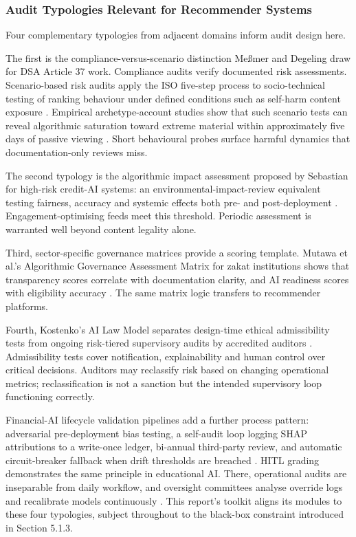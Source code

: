 \documentclass[11pt]{article}
\begin{document}
\subsubsection{Audit Typologies Relevant for Recommender Systems}
\label{sec:audit_typologies_recommenders} Four complementary typologies from adjacent domains inform audit design here.

The first is the compliance-versus-scenario distinction Me{\ss}mer and Degeling draw for DSA Article 37 work. Compliance audits verify documented risk assessments. Scenario-based risk audits apply the ISO five-step process to socio-technical testing of ranking behaviour under defined conditions such as self-harm content exposure \parencites[21]{3195574}. Empirical archetype-account studies show that such scenario tests can reveal algorithmic saturation toward extreme material within approximately five days of passive viewing \parencites[4]{2580223}. Short behavioural probes surface harmful dynamics that documentation-only reviews miss.

The second typology is the algorithmic impact assessment proposed by Sebastian for high-risk credit-AI systems: an environmental-impact-review equivalent testing fairness, accuracy and systemic effects both pre- and post-deployment \parencites[15]{5442231}. Engagement-optimising feeds meet this threshold. Periodic assessment is warranted well beyond content legality alone.

Third, sector-specific governance matrices provide a scoring template. Mutawa et al.'s Algorithmic Governance Assessment Matrix for zakat institutions shows that transparency scores correlate with documentation clarity, and AI readiness scores with eligibility accuracy \parencites[4]{2702055}[8]{2702055}. The same matrix logic transfers to recommender platforms.

Fourth, Kostenko's AI Law Model separates design-time ethical admissibility tests from ongoing risk-tiered supervisory audits by accredited auditors \parencites[8]{2977039}[9]{2977039}. Admissibility tests cover notification, explainability and human control over critical decisions. Auditors may reclassify risk based on changing operational metrics; reclassification is not a sanction but the intended supervisory loop functioning correctly.

Financial-AI lifecycle validation pipelines add a further process pattern: adversarial pre-deployment bias testing, a self-audit loop logging SHAP attributions to a write-once ledger, bi-annual third-party review, and automatic circuit-breaker fallback when drift thresholds are breached \parencites[7]{8907572}. HITL grading demonstrates the same principle in educational AI. There, operational audits are inseparable from daily workflow, and oversight committees analyse override logs and recalibrate models continuously \parencites[21]{6805789}. This report's toolkit aligns its modules to these four typologies, subject throughout to the black-box constraint introduced in Section 5.1.3.
\end{document}

